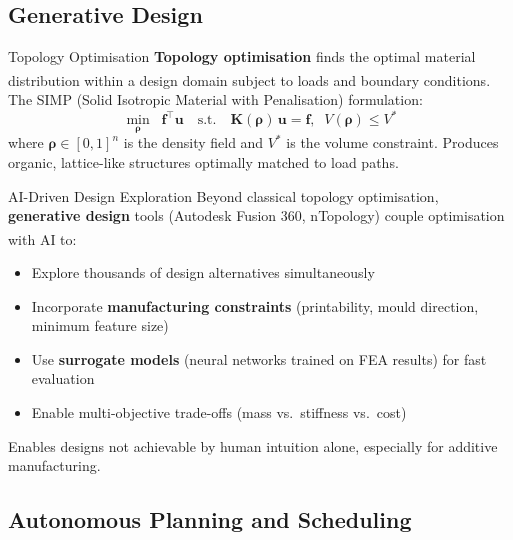 \subsection{Generative Design}

\begin{v3topic}{Topology Optimisation}
    \textbf{Topology optimisation} finds the optimal material distribution within a design domain subject to loads and boundary conditions\textsuperscript{\cite[][pp.~1549--1551]{sigristTopologyOptimizationReview2021}}.
    The SIMP (Solid Isotropic Material with Penalisation) formulation:
    \begin{equation}
        \min_{\boldsymbol{\rho}} \;\; \mathbf{f}^\top \mathbf{u} \quad \text{s.t.} \quad \mathbf{K}(\boldsymbol{\rho})\,\mathbf{u} = \mathbf{f},\;\; V(\boldsymbol{\rho}) \leq V^*
    \end{equation}
    where $\boldsymbol{\rho} \in [0,1]^n$ is the density field and $V^*$ is the volume constraint.
    Produces organic, lattice-like structures optimally matched to load paths.

\end{v3topic}
\begin{v3topic}{AI-Driven Design Exploration}
    Beyond classical topology optimisation, \textbf{generative design} tools (Autodesk Fusion 360, nTopology) couple optimisation with AI to\textsuperscript{\cite[][pp.~1560--1565]{sigristTopologyOptimizationReview2021}}:
    \begin{itemize}
        \item Explore thousands of design alternatives simultaneously
        \item Incorporate \textbf{manufacturing constraints} (printability, mould direction, minimum feature size)
        \item Use \textbf{surrogate models} (neural networks trained on FEA results) for fast evaluation
        \item Enable multi-objective trade-offs (mass vs.\ stiffness vs.\ cost)
    \end{itemize}
    Enables designs not achievable by human intuition alone, especially for additive manufacturing.
\end{v3topic}

\subsection{Autonomous Planning and Scheduling}

